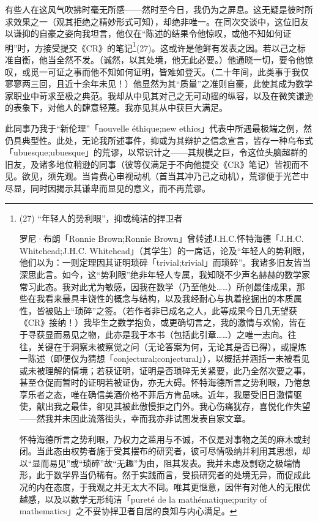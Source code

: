 有些人在这风气吹拂时毫无所感——然时至今日，我仍为之屏息。这无疑是彼时所求效果之一（观其拒绝之精妙形式可知），却绝非唯一。在同次交谈中，这位旧友以谦抑的自豪之姿向我坦言，他仅在“陈述的结果令他惊叹，或他不知如何证明”时，方接受提交《CR》的笔记\footnote{(27) “年轻人的势利眼”，抑或纯洁的捍卫者

罗尼·布朗「Ronnie Brown;Ronnie Brown」曾转述J.H.C.怀特海德「J.H.C. Whitehead;J.H.C. Whitehead」（其学生）的一席话，论及“年轻人的势利眼，他们以为：一则定理因其证明琐碎「trivial;trivial」而琐碎”。我诸多旧友皆当深思此言。如今，这“势利眼”绝非年轻人专属，我知晓不少声名赫赫的数学家常习此态。我对此尤为敏感，因我在数学（乃至他处……）所创最佳成果，那些在我看来最具丰饶性的概念与结构，以及我经耐心与执着挖掘出的本质属性，皆被贴上“琐碎”之签。（若作者非已成名之人，此等成果今日几无望获《CR》接纳！）我毕生之数学抱负，或更确切言之，我的激情与欢愉，皆在于寻获显而易见之物，此亦是我于本书（包括此引章……）之唯一志向。往往，关键在于洞察未被察觉之问（无论答案为何，无论其是否已得），或提炼一陈述（即便仅为猜想「conjectural;conjectural」），以概括并涵括一未被看见或未被理解的情境；若获证明，证明是否琐碎无关紧要，此乃全然次要之事，甚至仓促而暂时的证明若被证伪，亦无大碍。怀特海德所言之势利眼，乃倦怠享乐者之态，唯在确信美酒价格不菲后方肯品味。近年，我屡受旧日激情驱使，献出我之最佳，卻见其被此傲慢拒之门外。我心伤痛犹存，喜悦化作失望——然我并未因此流落街头，幸而我亦非试图发表自家文章。

怀特海德所言之势利眼，乃权力之滥用与不诚，不仅是对事物之美的麻木或封闭。当此态由权势者施于受其摆布的研究者，彼可尽情吸纳并利用其思想，却以“显而易见”或“琐碎”故“无趣”为由，阻其发表。我并未虑及剽窃之极端情形，此于数学界当仍稀有。然于实践而言，受损研究者的处境无异，而促成此况的内在态度，于我观之并无太大不同。唯其更惬意，因伴有对他人的无限优越感，以及以数学无形纯洁「pureté de la mathématique;purity of mathematics」之不妥协捍卫者自居的良知与内心满足。}(27)。这或许是他鲜有发表之因。若以己之标准自衡，他当全然不发。（诚然，以其处境，他无此必要。）他通晓一切，要令他惊叹，或觅一可证之事而他不知如何证明，皆难如登天。（二十年间，此类事于我仅寥寥两三回，且近十余年未见！）他显然为其“质量”之准则自豪，此使其成为数学家职业中苛求至极之典范。我却从中见其对己之无可动摇的纵容，以及在微笑谦逊的表象下，对他人的肆意轻蔑。我亦见其从中获巨大满足。

此同事乃我于“新伦理”「nouvelle éthique;new ethics」代表中所遇最极端之例，然仍具典型性。此处，无论我所述事件，抑或为其辩护之信念宣言，皆存一种乌布式「ubuesque;ubuesque」的荒谬，以常识计之——其规模之巨，令这位头脑超群的旧友，及诸多地位稍逊的同事（彼等仅满足于不向他提交《CR》笔记）皆视而不见。欲见，须先观。当肯费心审视动机（首当其冲乃己之动机），荒谬便于光芒中尽显，同时因揭示其谦卑而显见的意义，而不再荒谬。

